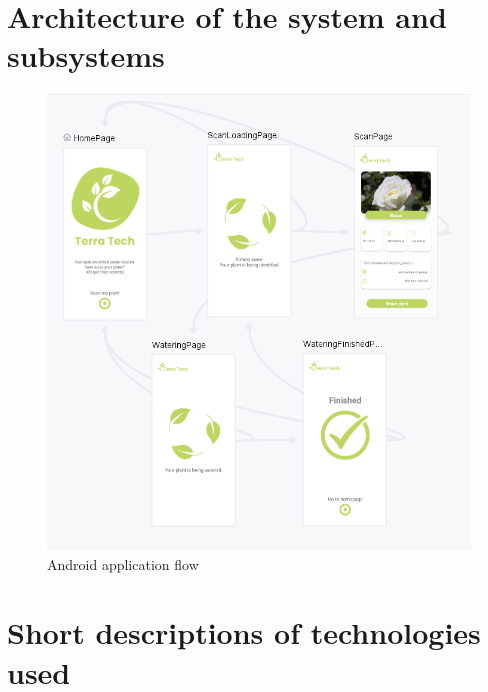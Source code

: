 \documentclass[12pt]{article}
\begin{document}
\section{Architecture of the system and subsystems}

\begin{figure}[ht]
    \centering
    \includegraphics[width=1.1\textwidth]{images/image7.png}
    \caption{Android application flow}
    \label{fig:pic7}
\end{figure} 

\newpage

\section{Short descriptions of technologies used}
\end{document}
